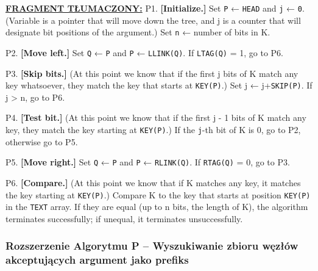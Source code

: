 	\ifsourcematerial
	\begin{displayquote}
		\color{ao(english)}
		\underline{\textbf{FRAGMENT TŁUMACZONY:}} \newline
		P1. \textbf{[Initialize.]} \newline
		Set \texttt{P} ← \texttt{HEAD} and \texttt{j} ← \texttt{0}. (Variable is a pointer that will move down the tree, and j is a counter that will designate bit positions of 	the argument.) \newline
		Set \texttt{n} ← number of bits in K.
		
		P2. \textbf{[Move left.]} \newline
		Set \texttt{Q} ← \texttt{P} and \texttt{P} ← \texttt{LLINK(Q)}. If \texttt{LTAG(Q)} = 1, go to P6. 
		
		P3. \textbf{[Skip bits.]} \newline
		(At this point we know that if the first j bits of K match any key whatsoever, they match the key that starts at \texttt{KEY(P)}.) \newline
		Set j ← j+\texttt{SKIP(P)}. \newline
		If j > n, go to P6.
		
		P4. \textbf{[Test bit.]} \newline
		(At this point we know that if the first j - 1 bits of K match any key, they match the key starting at \texttt{KEY(P)}.) \newline
		If the \texttt{j}-th bit of K is 0, go to P2, otherwise go to P5.
		
		P5. \textbf{[Move right.]} \newline
		Set \texttt{Q} ← \texttt{P} and \texttt{P} ← \texttt{RLINK(Q)}.
		If \texttt{RTAG(Q)} = 0, go to P3.
		
		P6. \textbf{[Compare.]} \newline
		(At this point we know that if K matches any key, it matches the key starting at \texttt{KEY(P)}.) \newline
		Compare K to the key that starts at position \texttt{KEY(P)} in the \texttt{TEXT} array. \newline
		If they are equal (up to n bits, the length of K), the algorithm terminates successfully; \newline
		if unequal, it terminates unsuccessfully.
	\end{displayquote}
	\fi	
	
	\subsubsection{Rozszerzenie Algorytmu P -- Wyszukiwanie zbioru węzłów akceptujących argument jako prefiks}\label{sec:AlgorytmPRozszerzenieWyszukiwanie}
	
